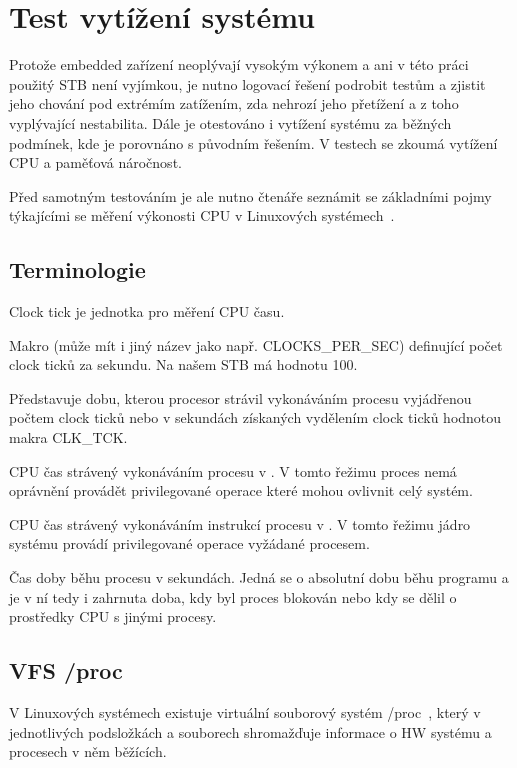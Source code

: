 \documentclass[thesis=B,czech]{FITthesis}[2012/06/26]
\begin{document}
\section{Test vytížení systému}
Protože embedded zařízení neoplývají vysokým výkonem a ani v této práci použitý STB není vyjímkou, je nutno logovací řešení podrobit testům a zjistit jeho chování pod extrémím zatížením, zda nehrozí jeho přetížení a z toho vyplývající nestabilita. Dále je otestováno i vytížení systému za běžných podmínek, kde je porovnáno s původním řešením. V testech se zkoumá vytížení CPU a paměťová náročnost.

Před samotným testováním je ale nutno čtenáře seznámit se základními pojmy týkajícími se měření výkonosti CPU v Linuxových systémech~\cite{MeasuringPerformance}.

\subsection{Terminologie}

\begin{description}
\setlength\itemsep{-1ex}
	\item [Clock tick:] Clock tick je jednotka pro měření CPU času.
	\item [CLK\_TCK:] Makro (může mít i jiný název jako např. CLOCKS\_PER\_SEC) definující počet clock ticků za sekundu. Na našem STB má hodnotu 100.
	\item [CPU time (CPU čas):] Představuje dobu, kterou procesor strávil vykonáváním procesu vyjádřenou počtem clock ticků nebo v sekundách získaných vydělením clock ticků hodnotou makra CLK\_TCK.
	\item [User time:] CPU čas strávený vykonáváním procesu v . V tomto řežimu proces nemá oprávnění provádět privilegované operace které mohou ovlivnit celý systém.
	\item [System time:] CPU čas strávený vykonáváním instrukcí procesu v . V tomto řežimu jádro systému provádí privilegované operace vyžádané procesem.
	\item [Real time:] Čas doby běhu procesu v sekundách. Jedná se o absolutní dobu běhu programu a je v ní tedy i zahrnuta doba, kdy byl proces blokován nebo kdy se dělil o prostředky CPU s jinými procesy.
	\end{description}

\subsection{VFS /proc}
V Linuxových systémech existuje virtuální souborový systém /proc~\cite{procFilesystem}, který v jednotlivých podsložkách a souborech shromažďuje informace o HW systému a procesech v něm běžících.
\end{document}
